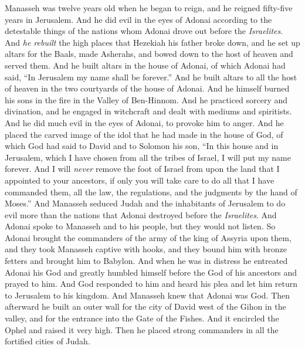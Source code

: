 \begin{biblechapter} %
 Manasseh was twelve years old when he began to reign, and he reigned fifty-five years in Jerusalem.
\verse And he did evil in the eyes of Adonai according to the detestable things of the nations whom Adonai drove out before the \textit{Israelites}.
\verse And \textit{he rebuilt} the high places that Hezekiah his father broke down, and he set up altars for the Baals, made Asherahs, and bowed down to the host of heaven and served them.
\verse And he built altars in the house of Adonai, of which Adonai had said, “In Jerusalem my name shall be forever.”
\verse And he built altars to all the host of heaven in the two courtyards of the house of Adonai.
\verse And he himself burned his sons in the fire in the Valley of Ben-Hinnom. And he practiced sorcery and divination, and he engaged in witchcraft and dealt with mediums and spiritists. And he did much evil in the eyes of Adonai, to provoke him to anger.
\verse And he placed the carved image of the idol that he had made in the house of God, of which God had said to David and to Solomon his son, “In this house and in Jerusalem, which I have chosen from all the tribes of Israel, I will put my name forever.
\verse And I will \textit{never} remove the foot of Israel from upon the land that I appointed to your ancestors, if only you will take care to do all that I have commanded them, all the law, the regulations, and the judgments by the hand of Moses.”
\verse And Manasseh seduced Judah and the inhabitants of Jerusalem to do evil more than the nations that Adonai destroyed before the \textit{Israelites}.
 And Adonai spoke to Manasseh and to his people, but they would not listen.
\verse So Adonai brought the commanders of the army of the king of Assyria upon them, and they took Manasseh captive with hooks, and they bound him with bronze fetters and brought him to Babylon.
\verse And when he was in distress he entreated Adonai his God and greatly humbled himself before the God of his ancestors
\verse and prayed to him. And God responded to him and heard his plea and let him return to Jerusalem to his kingdom. And Manasseh knew that Adonai was God.
\verse Then afterward he built an outer wall for the city of David west of the Gihon in the valley, and for the entrance into the Gate of the Fishes. And it encircled the Ophel and raised it very high. Then he placed strong commanders in all the fortified cities of Judah.

\end{biblechapter}
